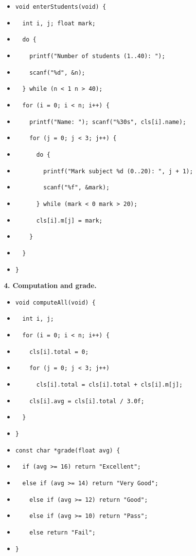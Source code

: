 \documentclass[11pt]{article}
\begin{document}
\begin{itemize}
\item \texttt{void enterStudents(void) \{}
\item \texttt{\ \ int i, j; float mark;}
\item \texttt{\ \ do \{}
\item \texttt{\ \ \ \ printf("Number of students (1..40): ");}
\item \texttt{\ \ \ \ scanf("\%d", \&n);}
\item \texttt{\ \ \} while (n < 1 \textbar\textbar n > 40);}
\item \texttt{\ \ for (i = 0; i < n; i++) \{}
\item \texttt{\ \ \ \ printf("Name: "); scanf("\%30s", cls[i].name);}
\item \texttt{\ \ \ \ for (j = 0; j < 3; j++) \{}
\item \texttt{\ \ \ \ \ \ do \{}
\item \texttt{\ \ \ \ \ \ \ \ printf("Mark subject \%d (0..20): ", j + 1);}
\item \texttt{\ \ \ \ \ \ \ \ scanf("\%f", \&mark);}
\item \texttt{\ \ \ \ \ \ \} while (mark < 0 \textbar\textbar mark > 20);}
\item \texttt{\ \ \ \ \ \ cls[i].m[j] = mark;}
\item \texttt{\ \ \ \ \}}
\item \texttt{\ \ \}}
\item \texttt{\}}
\end{itemize}

\textbf{4. Computation and grade.}

\begin{itemize}
\item \texttt{void computeAll(void) \{}
\item \texttt{\ \ int i, j;}
\item \texttt{\ \ for (i = 0; i < n; i++) \{}
\item \texttt{\ \ \ \ cls[i].total = 0;}
\item \texttt{\ \ \ \ for (j = 0; j < 3; j++)}
\item \texttt{\ \ \ \ \ \ cls[i].total = cls[i].total + cls[i].m[j];}
\item \texttt{\ \ \ \ cls[i].avg = cls[i].total / 3.0f;}
\item \texttt{\ \ \}}
\item \texttt{\}}
\end{itemize}

\begin{itemize}
\item \texttt{const char *grade(float avg) \{}
\item \texttt{\ \ if (avg >= 16) return "Excellent";}
\item \texttt{\ \ else if (avg >= 14) return "Very Good";}
\item \texttt{\ \ \ \ else if (avg >= 12) return "Good";}
\item \texttt{\ \ \ \ else if (avg >= 10) return "Pass";}
\item \texttt{\ \ \ \ else return "Fail";}
\item \texttt{\}}
\end{itemize}
\end{document}
